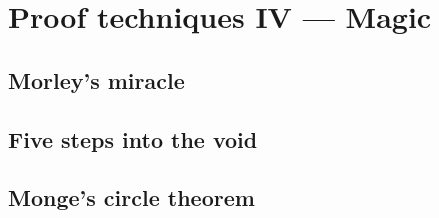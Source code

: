 \chapter{Proof techniques IV --- Magic}

\section{Morley's miracle}




\newpage

\section{Five steps into the void}




\newpage

\section{Monge's circle theorem}






